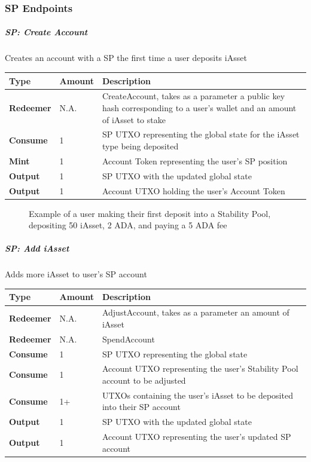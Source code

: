 \documentclass{article}
\begin{document}
\begin{sloppypar}
\hypertarget{sp-endpoints}{%
\subsubsection{SP Endpoints}\label{sp-endpoints}}

\hypertarget{sp-create-account}{%
\subparagraph{SP: Create Account}\label{sp-create-account}}

Creates an account with a SP the first time a user deposits iAsset

\begin{tabularx}{\linewidth}{l|l|L}
\toprule
\textbf{Type} & \textbf{Amount} & \textbf{Description}
\tabularnewline
\midrule
\endhead
\textbf{Redeemer} & N.A. & CreateAccount, takes as a parameter a public
key hash corresponding to a user's wallet and an amount of iAsset to
stake
\tabularnewline
\midrule
\textbf{Consume} & 1 & SP UTXO representing the global state for the
iAsset type being deposited
\tabularnewline
\midrule
\textbf{Mint} & 1 & Account Token representing the user's SP
position
\tabularnewline
\midrule
\textbf{Output} & 1 & SP UTXO with the updated global
state
\tabularnewline
\midrule
\textbf{Output} & 1 & Account UTXO holding the user's Account
Token
\tabularnewline
\bottomrule
\end{tabularx}

\hypertarget{sp-create-figure}{%
\begin{figure}[htbp]
\centering

\caption{Example of a user making their first deposit into a
Stability Pool, depositing 50 iAsset, 2 ADA, and paying a 5 ADA
fee}
\label{sp-create-figure}
\end{figure}}

\hypertarget{sp-add-iasset}{%
\subparagraph{SP: Add iAsset}\label{sp-add-iasset}}

Adds more iAsset to user's SP account

\begin{tabularx}{\linewidth}{l|l|L}
\toprule
\textbf{Type} & \textbf{Amount} & \textbf{Description}
\tabularnewline
\midrule
\endhead
\textbf{Redeemer} & N.A. & AdjustAccount, takes as a parameter an amount
of iAsset
\tabularnewline
\midrule
\textbf{Redeemer} & N.A. & SpendAccount
\tabularnewline
\midrule
\textbf{Consume} & 1 & SP UTXO representing the global
state
\tabularnewline
\midrule
\textbf{Consume} & 1 & Account UTXO representing the user's Stability
Pool account to be adjusted
\tabularnewline
\midrule
\textbf{Consume} & 1+ & UTXOs containing the user's iAsset to be
deposited into their SP account
\tabularnewline
\midrule
\textbf{Output} & 1 & SP UTXO with the updated global
state
\tabularnewline
\midrule
\textbf{Output} & 1 & Account UTXO representing the user's updated SP
account
\tabularnewline
\bottomrule
\end{tabularx}


\end{sloppypar}
\end{document}
